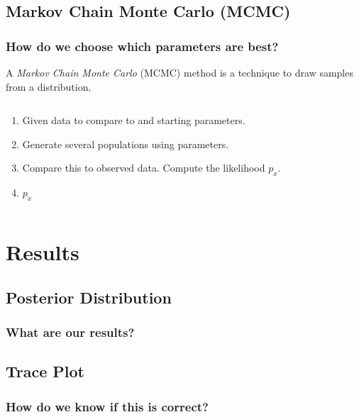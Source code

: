 \documentclass[11pt]{beamer}
\begin{document}
	\subsection{Markov Chain Monte Carlo (MCMC)}\label{subsec:mcmc}
    \begin{frame}
        \frametitle{How do we choose which parameters are best?}
        \begin{definition}
            A \emph{Markov Chain Monte Carlo} (MCMC) method is a technique to draw samples from a distribution.
        \end{definition}
        \begin{columns}
            \begin{column}{0.5\textwidth}
                \begin{enumerate}
                    \item Given data to compare to and starting parameters. \medskip
                    \item Generate several populations using parameters. \medskip
                    \item Compare this to observed data. Compute the likelihood $p_x$. \medskip
                    \item  $p_x$
                \end{enumerate}
            \end{column}
            \begin{column}{0.6\textwidth}
                \medskip
                \centering{} \newline
            \end{column}
        \end{columns}
    \end{frame}

    \section{Results}\label{sec:r}
    \subsection{Posterior Distribution}\label{subsec:pd}
    \begin{frame}
        \frametitle{What are our results?}
    \end{frame}

    \subsection{Trace Plot}\label{subsec:tp}
    \begin{frame}
        \frametitle{How do we know if this is correct?}
    \end{frame}
\end{document}
